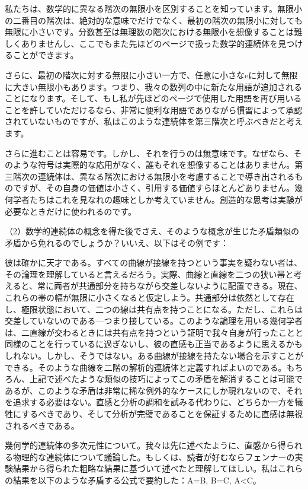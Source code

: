 \documentclass[a4paper,11pt,openany]{ltjsbook}
\begin{document}
私たちは、数学的に異なる階次の無限小を区別することを知っています。無限小の二番目の階次は、絶対的な意味でだけでなく、最初の階次の無限小に対しても無限に小さいです。分数甚至は無理数の階次における無限小を想像することは難しくありませんし、ここでもまた先ほどのページで扱った数学的連続体を見つけることができます。

さらに、最初の階次に対する無限に小さい一方で、任意に小さなeに対して無限に大きい無限小もあります。つまり、我々の数列の中に新たな用語が追加されることになります。そして、もし私が先ほどのページで使用した用語を再び用いることを許していただけるなら、非常に便利な用語でありながら慣習によって承認されていないものですが、私はこのような連続体を第三階次と呼ぶべきだと考えます。

さらに進むことは容易です。しかし、それを行うのは無意味です。なぜなら、そのような符号は実際的な応用がなく、誰もそれを想像することはありません。第三階次の連続体は、異なる階次における無限小を考慮することで導き出されるものですが、その自身の価値は小さく、引用する価値すらほとんどありません。幾何学者たちはこれを見なれの趣味としか考えていません。創造的な思考は実験が必要なときだけに使われるのです。

（2）数学的連続体の概念を得た後でさえ、そのような概念が生じた矛盾類似の矛盾から免れるのでしょうか？いいえ、以下はその例です：

彼は確かに天才である。すべての曲線が接線を持つという事実を疑わない者は、その論理を理解していると言えるだろう。実際、曲線と直線を二つの狭い帯と考えると、常に両者が共通部分を持ちながら交差しないように配置できる。現在、これらの帯の幅が無限に小さくなると仮定しよう。共通部分は依然として存在し、極限状態において、二つの線は共有点を持つことになる。ただし、これらは交差していないのである—つまり接している。このような論理を用いる幾何学者は、二直線が交わるときには共有点を持つという証明で我々自身が行ったことと同様のことを行っているに過ぎないし、彼の直感も正当であるように思えるかもしれない。しかし、そうではない。ある曲線が接線を持たない場合を示すことができる。そのような曲線を二階の解析的連続体と定義すればよいのである。もちろん、上記で述べたような類似の技巧によってこの矛盾を解消することは可能であるが、このような矛盾は非常に稀な例外的なケースにしか現れないので、それを追求する必要はない。直感と分析の調和を試みる代わりに、どちらか一方を犠牲にするべきであり、そして分析が完璧であることを保証するために直感は無視されるべきである。

幾何学的連続体の多次元性について。我々は先に述べたように、直感から得られる物理的な連続体について議論した。もしくは、読者が好むならフェンナーの実験結果から得られた粗略な結果に基づいて述べたと理解してほしい。私はこれらの結果を以下のような矛盾する公式で要約した：A=B, B=C, A<C。
\end{document}
